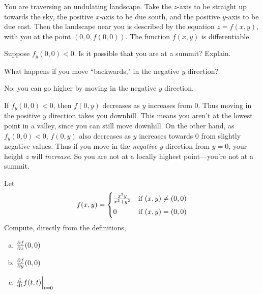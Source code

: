 \begin{question}
You are traversing an undulating landscape. Take the $z$-axis to be straight up towards the sky, the positive $x$-axis to be due south, and the positive $y$-axis to be due east. Then the landscape near you is described by the equation $z=f(x,y)$, with you at the point $(0,0,f(0,0))$. The function $f(x,y)$ is differentiable.

Suppose $f_y(0,0)<0$. Is it possible that you are at a summit? Explain.

\end{question}
\begin{hint}
What happens if you move ``backwards," in the negative $y$ direction?
\end{hint}
\begin{answer}
No: you can go higher by moving in the negative $y$ direction.
\end{answer}
\begin{solution}

If $f_y(0,0)<0$, then $f(0,y)$ decreases as $y$ increases from $0$.
Thus moving in the positive $y$ direction takes you downhill. This means 
you aren't at the lowest point in a valley, since you can still move downhill.
On the other hand, as $f_y(0,0)<0$, $f(0,y)$ also decreases as $y$ 
increases towards $0$ from slightly negative values. Thus if you move in the \emph{negative} $y$-direction from $y=0$, your height $z$ will \emph{increase}. 
So you are not at a locally highest point---you're not at a summit.

\end{solution}

\begin{question}[M226 2009D] %
Let
\begin{equation*}
f(x,y)=\begin{cases}\frac{x^2y}{x^2+y^2}& \text{if $(x,y)\ne (0,0)$} \\
                \noalign{\vskip0.05in}
                0 & \text{if $(x,y)=(0,0)$}
       \end{cases}
\end{equation*}
Compute, directly from the definitions,
\begin{enumerate}[(a)]
\item
$\pdiff{f}{x}(0,0)$ 
\item
$\pdiff{f}{y}(0,0)$
\item
$\diff{}{t} f(t,t)\Big|_{t=0}$
\end{enumerate}
\end{question}

